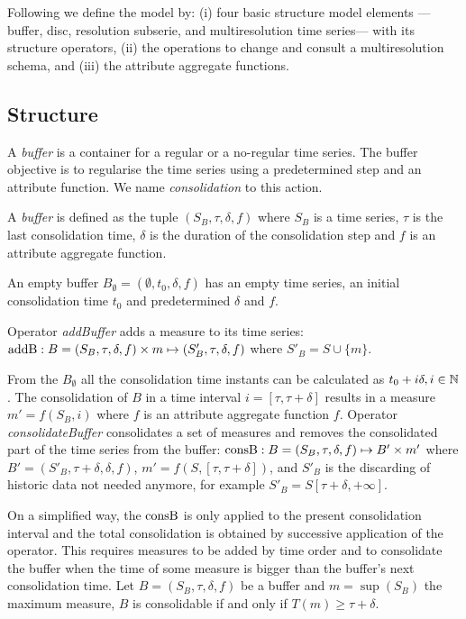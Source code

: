 Following we define the  model by: (i) four basic
structure model elements ---buffer, disc, resolution subserie, and
multiresolution time series--- with its structure operators, (ii) the
operations to change and consult a multiresolution schema, and (iii)
the attribute aggregate functions.



\subsection{Structure}

A \emph{buffer} is a container for a regular or a no-regular time
series. The buffer objective is to regularise the time series using a
predetermined step and an attribute function. We name
\emph{consolidation} to this action.
\begin{definition}[Buffer]
  A \emph{buffer} is defined as the tuple $(S_B,\tau,\delta,f)$ where
  $S_B$ is a time series, $\tau$ is the last consolidation time,
  $\delta$ is the duration of the consolidation step and $f$ is an
  attribute aggregate function.

  An empty buffer $B_{\emptyset} = (\emptyset,t_0, \delta, f)$ has an
  empty time series, an initial consolidation time $t_0$ and
  predetermined $\delta$ and $f$.
\end{definition}

Operator \emph{addBuffer} adds a measure to its time series:
$\operatorname{addB}: B = (S_B,\tau,\delta,f) \times m \mapsto
(S'_B,\tau,\delta,f)$ where $S'_B = S \cup \{m\} $.

From the $B_{\emptyset}$ all the consolidation time instants can be
calculated as $t_0+i\delta, i\in\mathbb{N}$. The consolidation of $B$ in a
time interval $i=[\tau,\tau+\delta]$ results in a measure
$m'=f(S_B,i)$ where $f$ is an attribute aggregate function
$f$. Operator \emph{consolidateBuffer} consolidates a set of measures
and removes the consolidated part of the time series from the buffer:
$\operatorname{consB} : B=(S_B,\tau,\delta,f) \mapsto B' \times m'$ where $ B'=
(S'_B,\tau+\delta,\delta,f)$, $m' = f(S,[\tau,\tau+\delta])$, and
$S'_B$ is the discarding of historic data not needed anymore, for example
$S'_B = S[\tau+\delta,+\infty]$.

On a simplified way, the $\operatorname{consB}$ is only applied to the present
consolidation interval and the total consolidation is obtained by
successive application of the operator. This requires measures to be
added by time order and to consolidate the buffer when the time of
some measure is bigger than the buffer's next consolidation time.  Let
$B=(S_B,\tau,\delta,f)$ be a buffer and $m=\sup(S_B)$ the maximum
measure, $B$ is consolidable if and only if $T(m) \geq
\tau+\delta$.


